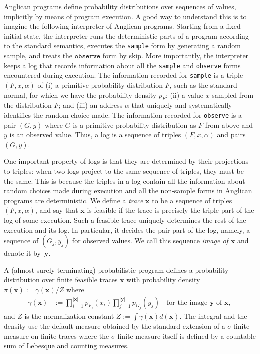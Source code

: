 \documentclass[preprint]{sigplanconf}
\begin{document}
Anglican programs define probability distributions 
over sequences of values, implicitly by means of program execution.
A good way to understand this is to imagine the following 
interpreter of Anglican programs. Starting from a fixed initial state,
the interpreter runs the deterministic parts of a program 
according to the standard semantics, executes the \texttt{sample} form by
generating a random sample, and treats the $\texttt{observe}$ form by skip.
More importantly, the interpreter keeps a log that records
information about all the \texttt{sample} and \texttt{observe} forms encountered 
during execution. The information recorded for \texttt{sample} is 
a triple $(F,x,\alpha)$ of (i) a primitive probability distribution $F$, 
such as the standard normal, for which we have 
the probability density $p_F$; (ii) a value $x$ sampled from the distribution $F$; 
and (iii) an address $\alpha$ that uniquely and systematically identifies the random 
choice made. The information recorded for \texttt{observe} is a pair $(G,y)$ where $G$
is a primitive probability distribution as $F$ from above and $y$ is an 
observed value. Thus, a log is a sequence of triples $(F,x,\alpha)$ and 
pairs $(G,y)$.

One important property of logs is that they are determined by 
their projections to triples: when two logs project to the same
sequence of triples, they must be the same. This is because
the triples in a log contain all the information about random choices
made during execution and all the non-sample forms in Anglican programs
are deterministic. We define a \textit{trace} $\pmb{x}$ to be a sequence
of triples $(F,x,\alpha)$, and say that $\pmb{x}$ is feasible if
the trace is precisely the triple part of the log of some execution. 
Such a feasible trace uniquely determines the rest of the execution and its log.
In particular, it decides the pair part of the log, namely, 
a sequence of $(G_j, y_j)$ for observed values. We call this sequence \textit{image of $\pmb{x}$} 
and denote it by~$\pmb{y}$. 

A (almost-surely terminating) probabilistic program defines a probability distribution 
over finite feasible traces $\pmb{x}$ with probability density 
$\pi(\pmb{x}) := \gamma(\pmb{x}) / Z$ where 
\begin{align}
  \gamma(\pmb{x}) 
  &:= 
  \prod_{i=1}^{\left|\pmb{x}\right|}
  p_{F_i}(x_i) \prod_{j=1}^{\left|\pmb{y}\right|}p_{G_j}(y_{j})
  \quad \mbox{for the image $\pmb{y}$ of $\pmb{x}$}, 
  \label{eqn:p-trace}
\end{align}
and $Z$ is the normalization constant $Z := \int \gamma(\pmb{x})d(\pmb{x})$. The integral and the density use the default measure obtained by the standard extension of
a $\sigma$-finite measure on finite traces where the $\sigma$-finite measure itself is defined by
a countable sum of Lebesque and counting measures.
\end{document}
